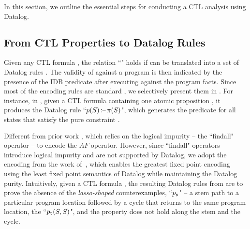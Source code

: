 In this section, we outline the essential steps for conducting a CTL analysis using Datalog. 


\subsection{From CTL Properties to Datalog Rules} 
\label{subsec:fromCTL2Datalog}

Given any CTL formula \code{\phi}, the relation ``\code{\CTLToD{\phi}{\nm}{\drule^*}}" holds if \code{\phi} can be translated into a set of Datalog rules  \code{\drule^*}. 
The validity of \code{\phi} against a program is then indicated by the presence of the IDB predicate \code{\m{\nm}} after executing \code{\drule^*} against the program facts. 
Since most of the encoding rules are standard \cite{rocca2014asp}, we selectively present them in . 
For instance, in \code{[\CTLtoDKey\m{AP}]}, given a CTL formula containing one atomic proposition  
\code{(\nm, \pi)}, it produces the Datalog rule ``$p(S) \,\text{:--}\, \pi(S)$", which generates the predicate \code{\nm} for all states that satisfy the pure constraint \code{\pi}. 






Different from prior work \cite{rocca2014asp}, which relies on the logical impurity -- the ``findall" operator --  to encode the $AF$ operator. 
However, since ``findall" operators introduce logical impurity and are not supported by Datalog, we adopt the encoding from the work of~\cite{gottlob2002datalog}, which enables the greatest fixed point encoding using the least fixed point semantics of Datalog while maintaining the Datalog purity. 
Intuitively, given a CTL formula , 
the resulting Datalog rules from \code{[\CTLtoDKey\m{AF}]} are to prove the absence of the \emph{lasso-shaped} \cite{DBLP:conf/cav/HeizmannHP14} 
counterexamples, \ie ``$p_{\mathtt{s}}$" -- a stem path to a particular program location followed by a cycle that returns to the same program location, \ie the ``$p_{\mathtt{t}}(S,S)$", and the property \code{\phi} does not hold along the stem and the cycle. 

